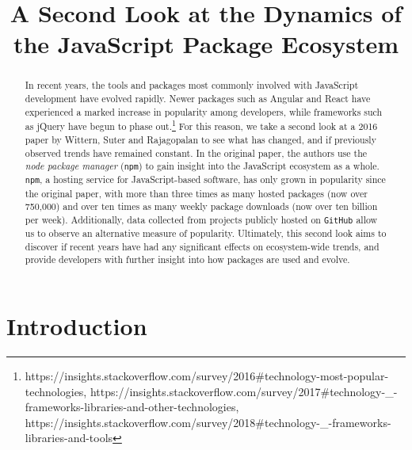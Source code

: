 \documentclass[10pt,conference]{IEEEtran}
\def\code#1{\texttt{#1}}
\begin{document}
\title{A Second Look at the Dynamics of the JavaScript Package Ecosystem\\}

\author{
}


\maketitle

\begin{abstract}
In recent years, the tools and packages most commonly involved with JavaScript development have evolved rapidly.
Newer packages such as Angular and React have experienced a marked increase in popularity among developers, while frameworks such as jQuery
have begun to phase out.\footnote[1]{https://insights.stackoverflow.com/survey/2016\#technology-most-popular-technologies, 
https://insights.stackoverflow.com/survey/2017\#technology-\_-frameworks-libraries-and-other-technologies, https://insights.stackoverflow.com/survey/2018\#technology-\_-frameworks-libraries-and-tools}
For this reason, we take a second look at a 2016 paper by Wittern, Suter and Rajagopalan \cite{Wittern:2016} to see what has changed, and if previously observed trends have remained constant.
In the original paper, the authors use the \emph{node package manager} (\code{npm}) to gain 
insight into the JavaScript ecosystem as a whole. \code{npm}, a hosting service for JavaScript-based software, has only grown in popularity since
the original paper, with more than three times as many hosted packages (now over 750,000) and over ten times as many weekly package downloads (now over ten billion per week).
Additionally, data collected from projects publicly hosted on \code{GitHub} allow us to observe an alternative measure of popularity. 
Ultimately, this second look aims to discover if recent years have had any significant effects on ecosystem-wide trends, and provide developers with further insight into how packages are used and evolve.
\end{abstract}

\section{Introduction}
\end{document}
